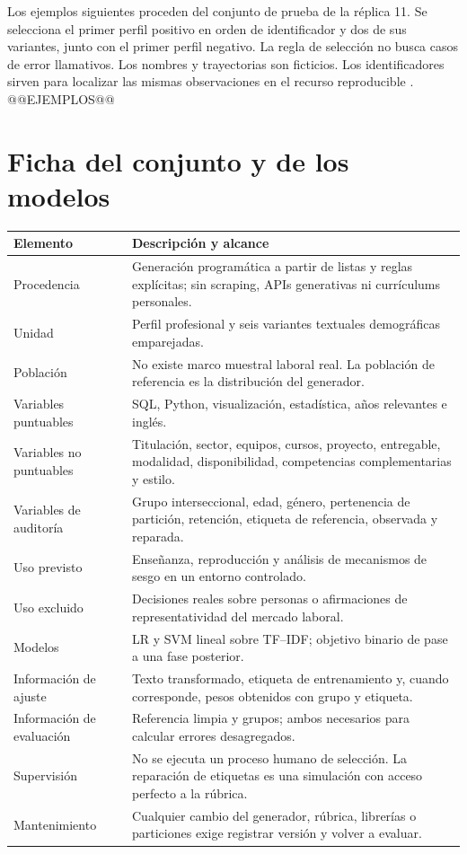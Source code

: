 Los ejemplos siguientes proceden del conjunto de prueba de la réplica 11. Se selecciona el primer perfil positivo en orden de identificador y dos de sus variantes, junto con el primer perfil negativo. La regla de selección no busca casos de error llamativos. Los nombres y trayectorias son ficticios. Los identificadores sirven para localizar las mismas observaciones en el recurso reproducible \cite{repositorio2026}.
@@EJEMPLOS@@

\chapter{Ficha del conjunto y de los modelos}
\begin{longtable}{p{3.2cm}p{10cm}}
\toprule Elemento & Descripción y alcance\\\midrule\endhead
Procedencia & Generación programática a partir de listas y reglas explícitas; sin scraping, APIs generativas ni currículums personales.\\
Unidad & Perfil profesional y seis variantes textuales demográficas emparejadas.\\
Población & No existe marco muestral laboral real. La población de referencia es la distribución del generador.\\
Variables puntuables & SQL, Python, visualización, estadística, años relevantes e inglés.\\
Variables no puntuables & Titulación, sector, equipos, cursos, proyecto, entregable, modalidad, disponibilidad, competencias complementarias y estilo.\\
Variables de auditoría & Grupo interseccional, edad, género, pertenencia de partición, retención, etiqueta de referencia, observada y reparada.\\
Uso previsto & Enseñanza, reproducción y análisis de mecanismos de sesgo en un entorno controlado.\\
Uso excluido & Decisiones reales sobre personas o afirmaciones de representatividad del mercado laboral.\\
Modelos & LR y SVM lineal sobre TF--IDF; objetivo binario de pase a una fase posterior.\\
Información de ajuste & Texto transformado, etiqueta de entrenamiento y, cuando corresponde, pesos obtenidos con grupo y etiqueta.\\
Información de evaluación & Referencia limpia y grupos; ambos necesarios para calcular errores desagregados.\\
Supervisión & No se ejecuta un proceso humano de selección. La reparación de etiquetas es una simulación con acceso perfecto a la rúbrica.\\
Mantenimiento & Cualquier cambio del generador, rúbrica, librerías o particiones exige registrar versión y volver a evaluar.\\\bottomrule
\end{longtable}

